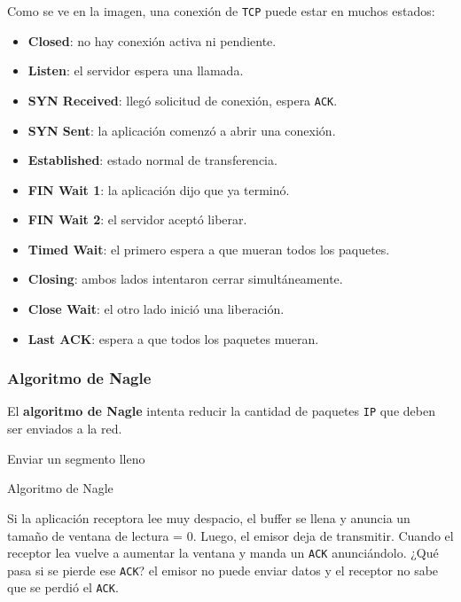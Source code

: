 \documentclass[]{article}
\begin{document}
Como se ve en la imagen, una conexión de \texttt{TCP} puede estar en muchos estados:
\begin{itemize}
    \item \textbf{Closed}: no hay conexión activa ni pendiente.
    \item \textbf{Listen}: el servidor espera una llamada.
    \item \textbf{SYN Received}: llegó solicitud de conexión, espera \texttt{ACK}.
    \item \textbf{SYN Sent}: la aplicación comenzó a abrir una conexión.
    \item \textbf{Established}: estado normal de transferencia.
    \item \textbf{FIN Wait 1}: la aplicación dijo que ya terminó.
    \item \textbf{FIN Wait 2}: el servidor aceptó liberar.
    \item \textbf{Timed Wait}: el primero espera a que mueran todos los paquetes.
    \item \textbf{Closing}: ambos lados intentaron cerrar simultáneamente.
    \item \textbf{Close Wait}: el otro lado inició una liberación.
    \item \textbf{Last ACK}: espera a que todos los paquetes mueran.
\end{itemize}


\subsubsection{Algoritmo de Nagle}

El \textbf{algoritmo de Nagle} intenta reducir la cantidad de paquetes \texttt{IP} que deben ser enviados a la red.

\begin{algorithm}[H]
  {
    Enviar un segmento lleno
 } {
 }
 \caption{Algoritmo de Nagle}
\end{algorithm}


Si la aplicación receptora lee muy despacio, el buffer se llena y anuncia un tamaño de ventana de lectura = 0. Luego, el emisor deja de transmitir. Cuando el receptor lea vuelve a aumentar la ventana y manda un \texttt{ACK} anunciándolo. ¿Qué pasa si se pierde ese \texttt{ACK}? el emisor no puede enviar datos y el receptor no sabe que se perdió el \texttt{ACK}.
\end{document}
